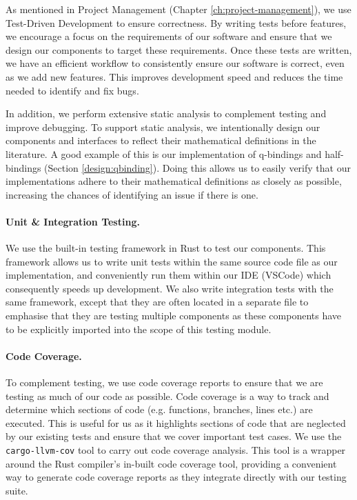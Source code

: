 As mentioned in Project Management (Chapter \ref{ch:project-management}), we use Test-Driven Development to 
ensure correctness. By writing tests before features, we encourage a focus on the 
requirements of our software and ensure that we design our components to target 
these requirements. Once these tests are written, we have an efficient workflow to 
consistently ensure our software is correct, even as we add new features. This improves
development speed and reduces the time needed to identify and fix bugs.

In addition, we perform extensive static analysis to complement testing and improve 
debugging. To support static analysis, we 
intentionally design our components and interfaces to reflect their 
mathematical definitions in the literature. A good example of this is our implementation of q-bindings and half-bindings
(Section \ref{design:qbinding}). Doing this allows us to easily verify that our implementations
adhere to their mathematical definitions as closely as possible, increasing the chances of 
identifying an issue if there is one.

\paragraph{Unit \& Integration Testing.}
We use the built-in testing framework in Rust to test our components. This framework allows us to write unit 
tests within the same source code file as our implementation, and conveniently run them within our 
IDE (VSCode) which consequently speeds up development. We also write integration tests with 
the same framework, except that they are often located in a separate file to emphasise that they are testing 
multiple components as these components have to be explicitly imported into the scope of this testing module. 

\paragraph{Code Coverage.} To complement testing, we use code coverage reports to ensure that we are testing 
as much of our code as possible. Code coverage is a way to track and determine which sections of code (e.g. 
functions, branches, lines etc.) are executed. This is useful for us as it highlights sections of code that 
are neglected by our existing tests and ensure that we cover important test cases. We use the 
\texttt{cargo-llvm-cov} \cite{cargo-llvm-cov} tool to carry out code coverage analysis. 
This tool is a wrapper around the Rust compiler's in-built code coverage tool, 
providing a convenient way to generate code coverage reports as they integrate directly 
with our testing suite. 

